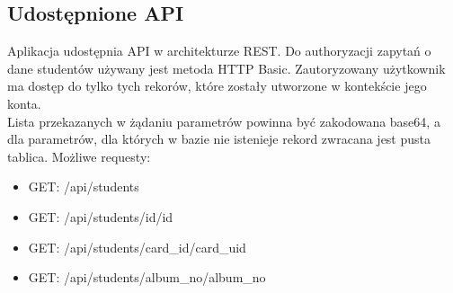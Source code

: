\documentclass[declaration,shortabstract, mgr]{iithesis}
\begin{document}
\subsection{Udostępnione API}
\indent Aplikacja udostępnia API w architekturze REST\cite{rest}. Do authoryzacji zapytań o dane studentów używany jest metoda HTTP Basic. Zautoryzowany użytkownik ma dostęp do tylko tych rekorów, które zostały utworzone w kontekście jego konta.\\
\indent Lista przekazanych w żądaniu parametrów powinna być zakodowana base64, a dla parametrów, dla których w bazie nie istenieje rekord zwracana jest pusta tablica.
\indent Możliwe requesty:
\begin{itemize}
\item GET: /api/students
\item GET: /api/students/id/{id}
\item GET: /api/students/card\_id/{card\_uid}
\item GET: /api/students/album\_no/{album\_no}
\end{itemize}
\end{document}
